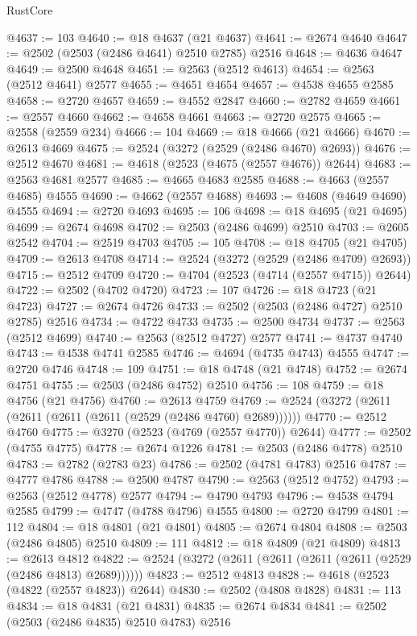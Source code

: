 \begin{lexlean}{RustCore}
\begin{coremodule}
@4637 := 103
@4640 := @18 @4637 (@21 @4637)
@4641 := @2674 @4640
@4647 := @2502 (@2503 (@2486 @4641) @2510 @2785) @2516
@4648 := @4636 @4647
@4649 := @2500 @4648
@4651 := @2563 (@2512 @4613)
@4654 := @2563 (@2512 @4641) @2577
@4655 := @4651 @4654
@4657 := @4538 @4655 @2585
@4658 := @2720 @4657
@4659 := @4552 @2847
@4660 := @2782 @4659
@4661 := @2557 @4660
@4662 := @4658 @4661
@4663 := @2720 @2575
@4665 := @2558 (@2559 @234)
@4666 := 104
@4669 := @18 @4666 (@21 @4666)
@4670 := @2613 @4669
@4675 := @2524 (@3272 (@2529 (@2486 @4670) @2693))
@4676 := @2512 @4670
@4681 := @4618 (@2523 (@4675 (@2557 @4676)) @2644)
@4683 := @2563 @4681 @2577
@4685 := @4665 @4683 @2585
@4688 := @4663 (@2557 @4685) @4555
@4690 := @4662 (@2557 @4688)
@4693 := @4608 (@4649 @4690) @4555
@4694 := @2720 @4693
@4695 := 106
@4698 := @18 @4695 (@21 @4695)
@4699 := @2674 @4698
@4702 := @2503 (@2486 @4699) @2510
@4703 := @2605 @2542
@4704 := @2519 @4703
@4705 := 105
@4708 := @18 @4705 (@21 @4705)
@4709 := @2613 @4708
@4714 := @2524 (@3272 (@2529 (@2486 @4709) @2693))
@4715 := @2512 @4709
@4720 := @4704 (@2523 (@4714 (@2557 @4715)) @2644)
@4722 := @2502 (@4702 @4720)
@4723 := 107
@4726 := @18 @4723 (@21 @4723)
@4727 := @2674 @4726
@4733 := @2502 (@2503 (@2486 @4727) @2510 @2785) @2516
@4734 := @4722 @4733
@4735 := @2500 @4734
@4737 := @2563 (@2512 @4699)
@4740 := @2563 (@2512 @4727) @2577
@4741 := @4737 @4740
@4743 := @4538 @4741 @2585
@4746 := @4694 (@4735 @4743) @4555
@4747 := @2720 @4746
@4748 := 109
@4751 := @18 @4748 (@21 @4748)
@4752 := @2674 @4751
@4755 := @2503 (@2486 @4752) @2510
@4756 := 108
@4759 := @18 @4756 (@21 @4756)
@4760 := @2613 @4759
@4769 := @2524 (@3272 (@2611 (@2611 (@2611 (@2611 (@2529 (@2486 @4760) @2689))))))
@4770 := @2512 @4760
@4775 := @3270 (@2523 (@4769 (@2557 @4770)) @2644)
@4777 := @2502 (@4755 @4775)
@4778 := @2674 @1226
@4781 := @2503 (@2486 @4778) @2510
@4783 := @2782 (@2783 @23)
@4786 := @2502 (@4781 @4783) @2516
@4787 := @4777 @4786
@4788 := @2500 @4787
@4790 := @2563 (@2512 @4752)
@4793 := @2563 (@2512 @4778) @2577
@4794 := @4790 @4793
@4796 := @4538 @4794 @2585
@4799 := @4747 (@4788 @4796) @4555
@4800 := @2720 @4799
@4801 := 112
@4804 := @18 @4801 (@21 @4801)
@4805 := @2674 @4804
@4808 := @2503 (@2486 @4805) @2510
@4809 := 111
@4812 := @18 @4809 (@21 @4809)
@4813 := @2613 @4812
@4822 := @2524 (@3272 (@2611 (@2611 (@2611 (@2611 (@2529 (@2486 @4813) @2689))))))
@4823 := @2512 @4813
@4828 := @4618 (@2523 (@4822 (@2557 @4823)) @2644)
@4830 := @2502 (@4808 @4828)
@4831 := 113
@4834 := @18 @4831 (@21 @4831)
@4835 := @2674 @4834
@4841 := @2502 (@2503 (@2486 @4835) @2510 @4783) @2516

\end{coremodule}
\end{lexlean}
